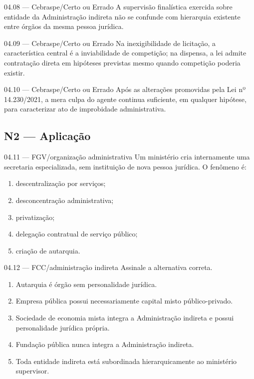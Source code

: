 \begin{questao}{ 04.08 — Cebraspe/Certo ou Errado}
A supervisão finalística exercida sobre entidade da Administração indireta não se confunde com hierarquia existente entre órgãos da mesma pessoa jurídica.
\end{questao}

\begin{questao}{ 04.09 — Cebraspe/Certo ou Errado}
Na inexigibilidade de licitação, a característica central é a inviabilidade de competição; na dispensa, a lei admite contratação direta em hipóteses previstas mesmo quando competição poderia existir.
\end{questao}

\begin{questao}{ 04.10 — Cebraspe/Certo ou Errado}
Após as alterações promovidas pela Lei nº 14.230/2021, a mera culpa do agente continua suficiente, em qualquer hipótese, para caracterizar ato de improbidade administrativa.
\end{questao}

\subsection*{N2 — Aplicação}

\begin{questao}{ 04.11 — FGV/organização administrativa}
Um ministério cria internamente uma secretaria especializada, sem instituição de nova pessoa jurídica. O fenômeno é:
\begin{enumerate}[label=\Alph*)]
\item descentralização por serviços;
\item desconcentração administrativa;
\item privatização;
\item delegação contratual de serviço público;
\item criação de autarquia.
\end{enumerate}
\end{questao}

\begin{questao}{ 04.12 — FCC/administração indireta}
Assinale a alternativa correta.
\begin{enumerate}[label=\Alph*)]
\item Autarquia é órgão sem personalidade jurídica.
\item Empresa pública possui necessariamente capital misto público-privado.
\item Sociedade de economia mista integra a Administração indireta e possui personalidade jurídica própria.
\item Fundação pública nunca integra a Administração indireta.
\item Toda entidade indireta está subordinada hierarquicamente ao ministério supervisor.
\end{enumerate}
\end{questao}

